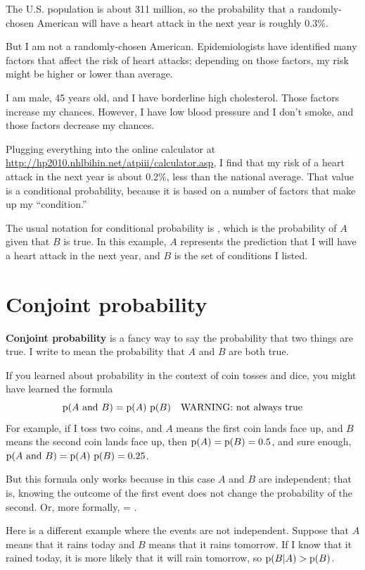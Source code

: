 \documentclass[12pt]{book}
\begin{document}
The U.S. population is about 311 million, so the probability that a
randomly-chosen American will have a heart attack in the next year is
roughly 0.3\%.

But I am not a randomly-chosen American.  Epidemiologists have
identified many factors that affect the risk of heart attacks;
depending on those factors, my risk might be higher or lower than
average.

I am male, 45 years old, and I have borderline high cholesterol.
Those factors increase my chances.  However, I have low blood pressure
and I don't smoke, and those factors decrease my chances.

Plugging everything into the online calculator at
\url{http://hp2010.nhlbihin.net/atpiii/calculator.asp}, I find that my
risk of a heart attack in the next year is about 0.2\%, less than the
national average.  That value is a conditional probability, because it
is based on a number of factors that make up my ``condition.''

The usual notation for conditional probability is , which
is the probability of $A$ given that $B$ is true.  In this
example, $A$ represents the prediction that I will have a heart
attack in the next year, and $B$ is the set of conditions I listed.


\section{Conjoint probability}

{\bf Conjoint probability} is a fancy way to say the probability that
two things are true.  I write  to mean the
probability that $A$ and $B$ are both true.

If you learned about probability in the context of coin tosses and
dice, you might have learned the formula
%
\[ \mathrm{p}(A ~\mathrm{and}~ B) = \mathrm{p}(A)~\mathrm{p}(B) \quad\mbox{WARNING: not always true}\]
%
For example, if I toss two coins, and $A$ means the first coin lands
face up, and $B$ means the second coin lands face up, then $\mathrm{p}(A) =
\mathrm{p}(B) = 0.5$, and sure enough, $\mathrm{p}(A ~\mathrm{and}~ B) = \mathrm{p}(A)~\mathrm{p}(B) = 0.25$.

But this formula only works because in this case $A$ and $B$ are
independent; that is, knowing the outcome of the first event does
not change the probability of the second.  Or, more formally,
 = .

Here is a different example where the events are not independent.
Suppose that $A$ means that it rains today and $B$ means that it
rains tomorrow.  If I know that it rained today, it is more likely
that it will rain tomorrow, so $\mathrm{p}(B|A) > \mathrm{p}(B)$.
\end{document}
